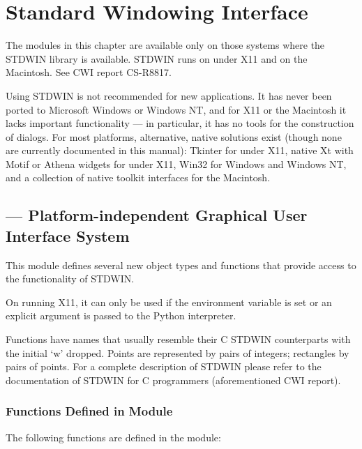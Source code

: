 \chapter{Standard Windowing Interface}

The modules in this chapter are available only on those systems where
the STDWIN library is available.  STDWIN runs on \UNIX{} under X11 and
on the Macintosh.  See CWI report CS-R8817.

 Using STDWIN is not recommended for new
applications.  It has never been ported to Microsoft Windows or
Windows NT, and for X11 or the Macintosh it lacks important
functionality --- in particular, it has no tools for the construction
of dialogs.  For most platforms, alternative, native solutions exist
(though none are currently documented in this manual): Tkinter for
\UNIX{} under X11, native Xt with Motif or Athena widgets for \UNIX{}
under X11, Win32 for Windows and Windows NT, and a collection of
native toolkit interfaces for the Macintosh.


\section{ ---
         Platform-independent Graphical User Interface System}



This module defines several new object types and functions that
provide access to the functionality of STDWIN.

On \UNIX{} running X11, it can only be used if the 
environment variable is set or an explicit
  argument is passed to the
Python interpreter.

Functions have names that usually resemble their C STDWIN counterparts
with the initial `w' dropped.  Points are represented by pairs of
integers; rectangles by pairs of points.  For a complete description
of STDWIN please refer to the documentation of STDWIN for C
programmers (aforementioned CWI report).

\subsection{Functions Defined in Module }

The following functions are defined in the  module:

